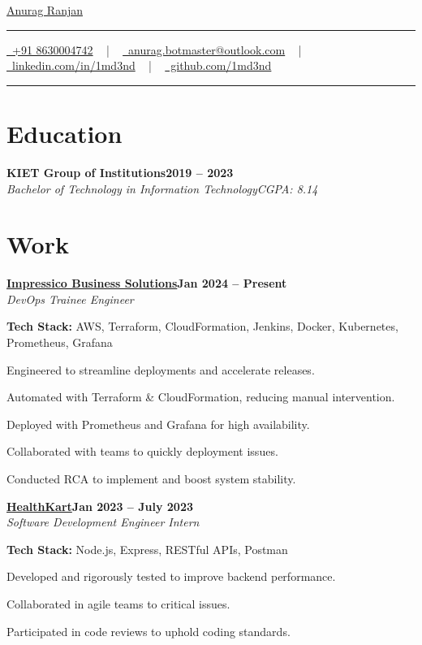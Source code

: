 \documentclass[letterpaper,10pt]{article}
\newcommand{\documentTitle}[2]{
  \begin{center}
    {\Huge\color{accentTitle} #1}
    \vspace{10pt}
    {\color{accentLine} \hrule}
    \vspace{2pt}
    \footnotesize{#2}
    \vspace{2pt}
    {\color{accentLine} \hrule}
  \end{center}
}
\newcommand{\heading}[2]{
  \hspace{10pt}#1\hfill#2\\
}
\newcommand{\headingBf}[2]{
  \heading{\textbf{#1}}{\textbf{#2}}
}
\newcommand{\headingIt}[2]{
  \heading{\textit{#1}}{\textit{#2}}
}
\newenvironment{resume_list}{
  \vspace{-7pt}
  \begin{itemize}[itemsep=-2px, parsep=1pt, leftmargin=30pt]
}{
  \end{itemize}
}
\begin{document}
\documentTitle{\href{https://1md3nd.com}{Anurag Ranjan}}{
    \href{tel:+918630004742}{\raisebox{-0.15\height} \faMobile\ +91 8630004742} ~ | ~
    \href{mailto:anurag.ranjan@impressico.com}{\raisebox{-0.15\height} \faEnvelope\ anurag.botmaster@outlook.com} ~ | ~
    \href{https://linkedin.com/in/1md3nd}{\raisebox{-0.15\height} \faLinkedin\ linkedin.com/in/1md3nd} ~ | ~
    \href{https://github.com/1md3nd}{\raisebox{-0.15\height} \faGithub\ github.com/1md3nd} 
}


\section{Education}

\headingBf{KIET Group of Institutions}{2019 -- 2023}
\headingIt{Bachelor of Technology in Information Technology}{CGPA: 8.14}

\section{Work}

\headingBf{ \href{https://www.impressico.com}{Impressico Business Solutions}}{Jan 2024 -- Present}  
\headingIt{DevOps Trainee Engineer}{}
\begin{resume_list}  
  \item \textbf{Tech Stack:} AWS, Terraform, CloudFormation, Jenkins, Docker, Kubernetes, Prometheus, Grafana
  \item Engineered \textbf{\color{accentTitle}{CI/CD pipelines}} to streamline deployments and accelerate releases.
  \item Automated \textbf{\color{accentTitle}{infrastructure provisioning}} with Terraform \& CloudFormation, reducing manual intervention.
  \item Deployed \textbf{\color{accentTitle}{monitoring solutions}} with Prometheus and Grafana for high availability.
  \item Collaborated with teams to quickly \textbf{\color{accentTitle}{diagnose and resolve}} deployment issues.
  \item Conducted RCA to implement \textbf{\color{accentTitle}{proactive measures}} and boost system stability.
\end{resume_list}

\headingBf{\href{https://www.healthcart.com}{HealthKart}}{Jan 2023 -- July 2023} 
\headingIt{Software Development Engineer Intern \href{https://drive.google.com/file/d/1Iz83NKtrG7A1KG_rK0P8s_sAquzRm_OY/view?usp=sharing}{\small\textit{\color{gray}{Link}}}}{}
\begin{resume_list}
  \item \textbf{Tech Stack:} Node.js, Express, RESTful APIs, Postman
  \item Developed and rigorously tested \textbf{\color{accentTitle}{RESTful APIs}} to improve backend performance.
  \item Collaborated in agile teams to \textbf{\color{accentTitle}{debug and resolve}} critical issues.
  \item Participated in code reviews to uphold coding standards.
\end{resume_list}
\end{document}
